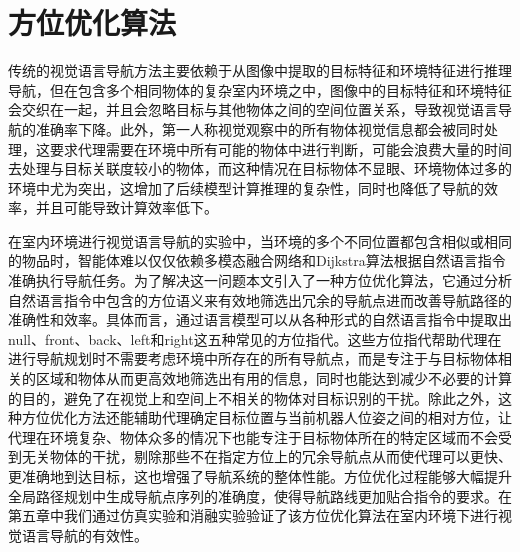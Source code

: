 \section{方位优化算法}
传统的视觉语言导航方法主要依赖于从图像中提取的目标特征和环境特征进行推理导航，但在包含多个相同物体的复杂室内环境之中，图像中的目标特征和环境特征会交织在一起，并且会忽略目标与其他物体之间的空间位置关系，导致视觉语言导航的准确率下降。此外，第一人称视觉观察中的所有物体视觉信息都会被同时处理，这要求代理需要在环境中所有可能的物体中进行判断，可能会浪费大量的时间去处理与目标关联度较小的物体，而这种情况在目标物体不显眼、环境物体过多的环境中尤为突出，这增加了后续模型计算推理的复杂性，同时也降低了导航的效率，并且可能导致计算效率低下。

在室内环境进行视觉语言导航的实验中，当环境的多个不同位置都包含相似或相同的物品时，智能体难以仅仅依赖多模态融合网络和Dijkstra算法根据自然语言指令准确执行导航任务。为了解决这一问题本文引入了一种方位优化算法，它通过分析自然语言指令中包含的方位语义来有效地筛选出冗余的导航点进而改善导航路径的准确性和效率。具体而言，通过语言模型可以从各种形式的自然语言指令中提取出null、front、back、left和right这五种常见的方位指代。这些方位指代帮助代理在进行导航规划时不需要考虑环境中所存在的所有导航点，而是专注于与目标物体相关的区域和物体从而更高效地筛选出有用的信息，同时也能达到减少不必要的计算的目的，避免了在视觉上和空间上不相关的物体对目标识别的干扰。除此之外，这种方位优化方法还能辅助代理确定目标位置与当前机器人位姿之间的相对方位，让代理在环境复杂、物体众多的情况下也能专注于目标物体所在的特定区域而不会受到无关物体的干扰，剔除那些不在指定方位上的冗余导航点从而使代理可以更快、更准确地到达目标，这也增强了导航系统的整体性能。方位优化过程能够大幅提升全局路径规划中生成导航点序列的准确度，使得导航路线更加贴合指令的要求。在第五章中我们通过仿真实验和消融实验验证了该方位优化算法在室内环境下进行视觉语言导航的有效性。

